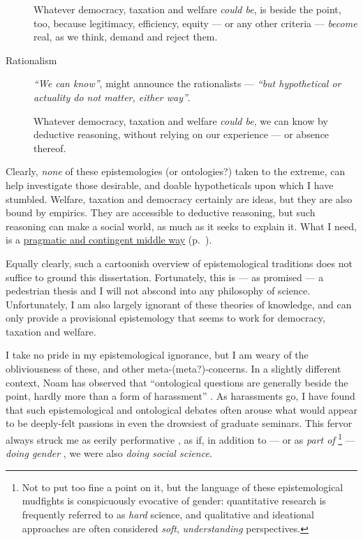 \begin{description}
	Whatever democracy, taxation and welfare \emph{could be}, is beside the point, too, because legitimacy, efficiency, equity --- or any other criteria --- \emph{become} real, as we think, demand and reject them.

	\item[Rationalism \phantomsection \label{itm:rationalism}]
	\emph{``We can know''}, might announce the rationalists \citep{Descartes1637,Spinoza1662,Leibniz1704} --- \emph{``but hypothetical or actuality do not matter, either way''}.

	Whatever democracy, taxation and welfare \emph{could be}, we can know by deductive reasoning, without relying on our experience --- or absence thereof.
\end{description}



Clearly, \emph{none} of these epistemologies (or ontologies?) taken to the extreme, can help investigate those desirable, and doable hypotheticals upon which I have stumbled.
Welfare, taxation and democracy certainly are ideas, but they are also bound by empirics.
They are accessible to deductive reasoning, but such reasoning can make a social world, as much as it seeks to explain it.
What I need, is a \hyperref[sec:epistemology]{pragmatic and contingent middle way} (p.~\pageref{sec:epistemology}). %

Equally clearly, such a cartoonish overview of epistemological traditions does not suffice to ground this dissertation.
Fortunately, this is --- as promised --- a pedestrian thesis and I will not abscond into any philosophy of science.
Unfortunately, I am also largely ignorant of these theories of knowledge, and can only provide a provisional epistemology that seems to work for democracy, taxation and welfare.

I take no pride in my epistemological ignorance, but I am weary of the obliviousness of these, and other meta-(meta?)-concerns.
In a slightly different context, Noam \citeauthor{Chomsky1997} has observed that ``ontological questions are generally beside the point, hardly more than a form of harassment'' \citeyearpar[132]{Chomsky1997}.
As harassments go, I have found that such epistemological and ontological debates often arouse what would appear to be deeply-felt passions in even the drowsiest of graduate seminars.
This fervor always struck me as eerily performative \cite[compare][]{Goffman1959,Butler1997}, as if, in addition to --- or as \emph{part of}
\footnote{
	Not to put too fine a point on it, but the language of these epistemological mudfights is conspicuously evocative of gender: quantitative research is frequently referred to as \emph{hard} science, and qualitative and ideational approaches are often considered \emph{soft}, \emph{understanding} perspectives.
}
--- \emph{doing gender} \citep{West1987}, we were also \emph{doing social science}.

